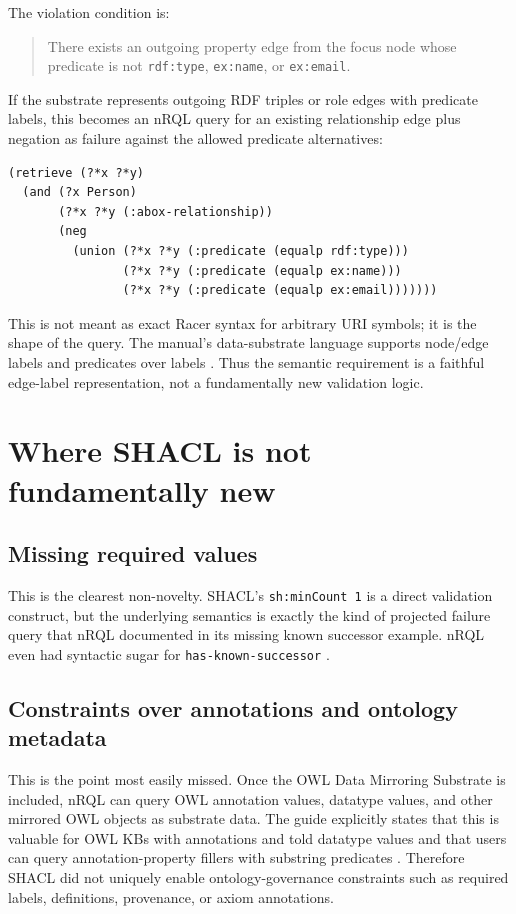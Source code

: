 \documentclass[11pt,letterpaper]{article}
\newcommand{\nrql}{nRQL}
\newcommand{\shacl}{SHACL}
\newcommand{\naf}{negation as failure}
\newcommand{\rdf}{RDF}
\newcommand{\owl}{OWL}
\begin{document}
The violation condition is:

\begin{quote}
There exists an outgoing property edge from the focus node whose predicate is not \texttt{rdf:type}, \texttt{ex:name}, or \texttt{ex:email}.
\end{quote}

If the substrate represents outgoing \rdf{} triples or role edges with predicate labels, this becomes an \nrql{} query for an existing relationship edge plus \naf{} against the allowed predicate alternatives:

\begin{lstlisting}[language=nrql]
(retrieve (?*x ?*y)
  (and (?x Person)
       (?*x ?*y (:abox-relationship))
       (neg
         (union (?*x ?*y (:predicate (equalp rdf:type)))
                (?*x ?*y (:predicate (equalp ex:name)))
                (?*x ?*y (:predicate (equalp ex:email)))))))
\end{lstlisting}

This is not meant as exact Racer syntax for arbitrary URI symbols; it is the shape of the query. The manual's data-substrate language supports node/edge labels and predicates over labels \cite[pp.~133,136--137,155--156]{racerug}. Thus the semantic requirement is a faithful edge-label representation, not a fundamentally new validation logic.

\section{Where SHACL is not fundamentally new}

\subsection{Missing required values}

This is the clearest non-novelty. \shacl{}'s \texttt{sh:minCount 1} is a direct validation construct, but the underlying semantics is exactly the kind of projected failure query that \nrql{} documented in its missing known successor example. \nrql{} even had syntactic sugar for \texttt{has-known-successor} \cite[pp.~115--116]{racerug}.

\subsection{Constraints over annotations and ontology metadata}

This is the point most easily missed. Once the \owl{} Data Mirroring Substrate is included, \nrql{} can query \owl{} annotation values, datatype values, and other mirrored \owl{} objects as substrate data. The guide explicitly states that this is valuable for \owl{} KBs with annotations and told datatype values and that users can query annotation-property fillers with substring predicates \cite[pp.~141--143]{racerug}. Therefore \shacl{} did not uniquely enable ontology-governance constraints such as required labels, definitions, provenance, or axiom annotations.
\end{document}
